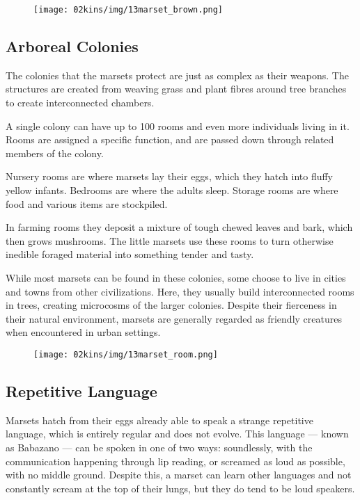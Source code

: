 \begin{linenumbers}
\begin{figure}[!b]
    \centering
    \texttt{[image: 02kins/img/13marset\_brown.png]}
\end{figure}

\subsection*{Arboreal Colonies}
The colonies that the marsets protect are just as complex as their weapons.
The structures are created from weaving grass and plant fibres around tree branches to create interconnected chambers.

A single colony can have up to 100 rooms and even more individuals living in it.
Rooms are assigned a specific function, and are passed down through related members of the colony.

Nursery rooms are where marsets lay their eggs, which they hatch into fluffy yellow infants.
Bedrooms are where the adults sleep.
Storage rooms are where food and various items are stockpiled.

In farming rooms they deposit a mixture of tough chewed leaves and bark, which then grows mushrooms.
The little marsets use these rooms to turn otherwise inedible foraged material into something tender and tasty.

While most marsets can be found in these colonies, some choose to live in cities and towns from other civilizations.
Here, they usually build interconnected rooms in trees, creating microcosms of the larger colonies.
Despite their fierceness in their natural environment, marsets are generally regarded as friendly creatures when encountered in urban settings.

\begin{figure}[!t]
    \centering
    \texttt{[image: 02kins/img/13marset\_room.png]}
\end{figure}

\subsection*{Repetitive Language}
Marsets hatch from their eggs already able to speak a strange repetitive language, which is entirely regular and does not evolve.
This language --- known as Babazano --- can be spoken in one of two ways: soundlessly, with the communication happening through lip reading, or screamed as loud as possible, with no middle ground.
Despite this, a marset can learn other languages and not constantly scream at the top of their lungs, but they do tend to be loud speakers.


\end{linenumbers}
